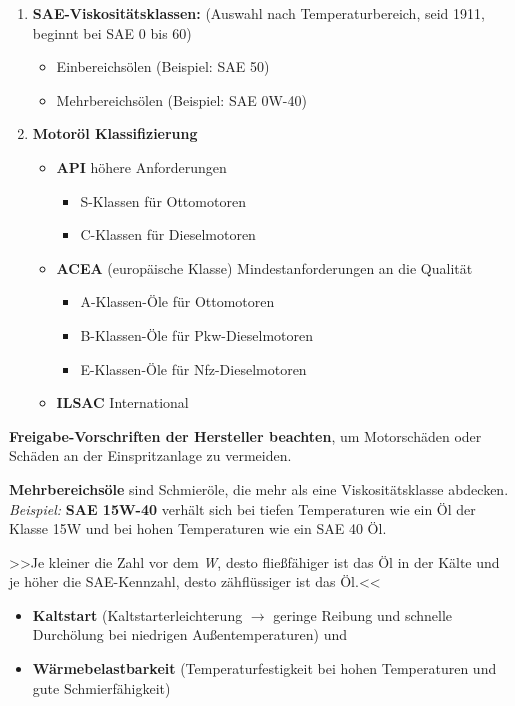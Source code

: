 \begin{enumerate}
\item
  \textbf{SAE-Viskositätsklassen:} (Auswahl nach Temperaturbereich, seid
  1911, beginnt bei SAE 0 bis 60)

  \begin{itemize}
  \item
    Einbereichsölen (Beispiel: SAE 50)
  \item
    Mehrbereichsölen (Beispiel: SAE 0W-40)
  \end{itemize}
\item
  \textbf{Motoröl Klassifizierung}

  \begin{itemize}
  \item
    \textbf{API} höhere Anforderungen

    \begin{itemize}
    \item
      S-Klassen für Ottomotoren
    \item
      C-Klassen für Dieselmotoren
    \end{itemize}
  \item
    \textbf{ACEA} (europäische Klasse) Mindestanforderungen an die
    Qualität

    \begin{itemize}
    \item
      A-Klassen-Öle für Ottomotoren
    \item
      B-Klassen-Öle für Pkw-Dieselmotoren
    \item
      E-Klassen-Öle für Nfz-Dieselmotoren
    \end{itemize}
  \item
    \textbf{ILSAC} International
  \end{itemize}
\end{enumerate}

\textbf{Freigabe-Vorschriften der Hersteller beachten}, um Motorschäden
oder Schäden an der Einspritzanlage zu vermeiden.

\textbf{Mehrbereichsöle} sind Schmieröle, die mehr als eine
Viskositätsklasse abdecken. \emph{Beispiel:} \textbf{SAE 15W-40} verhält
sich bei tiefen Temperaturen wie ein Öl der Klasse 15W und bei hohen
Temperaturen wie ein SAE 40 Öl.

>>Je kleiner die Zahl vor dem \emph{W}, desto fließfähiger ist das Öl in
der Kälte und je höher die SAE-Kennzahl, desto zähflüssiger ist das
Öl.<<

\begin{itemize}
\item
  \textbf{Kaltstart} (Kaltstarterleichterung $\to$ geringe Reibung und
  schnelle Durchölung bei niedrigen Außentemperaturen) und
\item
  \textbf{Wärmebelastbarkeit} (Temperaturfestigkeit bei hohen
  Temperaturen und gute Schmierfähigkeit)
\end{itemize}

